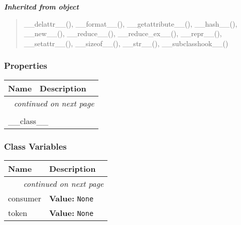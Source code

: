 \large{\textbf{\textit{Inherited from object}}}

\begin{quote}
\_\_delattr\_\_(), \_\_format\_\_(), \_\_getattribute\_\_(), \_\_hash\_\_(), \_\_new\_\_(), \_\_reduce\_\_(), \_\_reduce\_ex\_\_(), \_\_repr\_\_(), \_\_setattr\_\_(), \_\_sizeof\_\_(), \_\_str\_\_(), \_\_subclasshook\_\_()
\end{quote}


  \subsubsection{Properties}

    \vspace{-1cm}
\hspace{\varindent}\begin{longtable}{|p{\varnamewidth}|p{\vardescrwidth}|l}
\cline{1-2}
\cline{1-2} \centering \textbf{Name} & \centering \textbf{Description}& \\
\cline{1-2}
\endhead\cline{1-2}\multicolumn{3}{r}{\small\textit{continued on next page}}\\\endfoot\cline{1-2}
\endlastfoot\multicolumn{2}{|l|}{\textit{Inherited from object}}\\
\multicolumn{2}{|p{\varwidth}|}{\raggedright \_\_class\_\_}\\
\cline{1-2}
\end{longtable}



  \subsubsection{Class Variables}

    \vspace{-1cm}
\hspace{\varindent}\begin{longtable}{|p{\varnamewidth}|p{\vardescrwidth}|l}
\cline{1-2}
\cline{1-2} \centering \textbf{Name} & \centering \textbf{Description}& \\
\cline{1-2}
\endhead\cline{1-2}\multicolumn{3}{r}{\small\textit{continued on next page}}\\\endfoot\cline{1-2}
\endlastfoot\raggedright c\-o\-n\-s\-u\-m\-e\-r\- & \raggedright \textbf{Value:} 
{\tt None}&\\
\cline{1-2}
\raggedright t\-o\-k\-e\-n\- & \raggedright \textbf{Value:} 
{\tt None}&\\
\cline{1-2}
\end{longtable}

